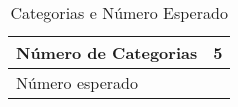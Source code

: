 \begin{table}[htbp]
\begin{center}
\begin{tabular}{|l|l|}
\hline
Número de Categorias & \multicolumn{1}{r|}{5} \\ \hline
Número esperado &  \\ \hline
\end{tabular}
\end{center}
\caption{Categorias e Número Esperado}
\label{tab:tabela2}
\end{table}

